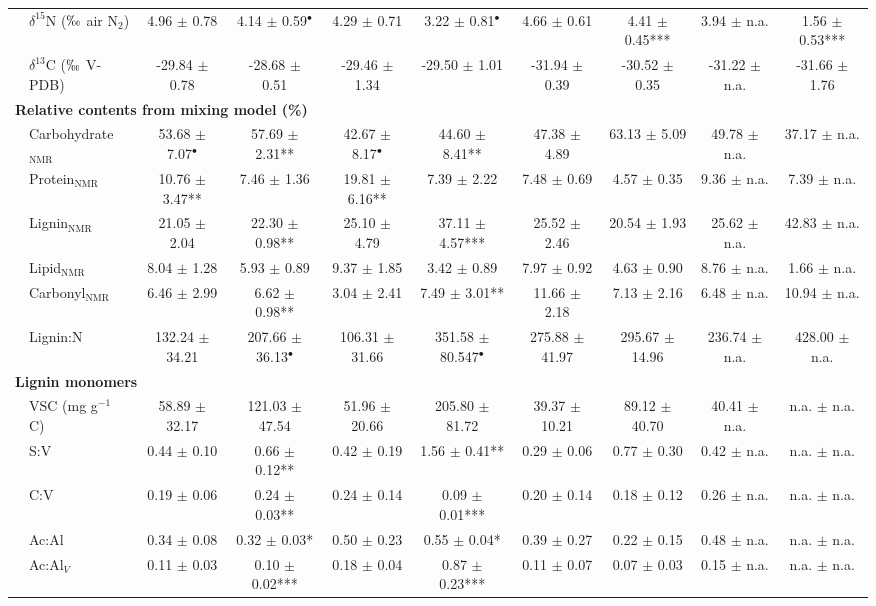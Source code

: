 \begin{table}
\begin{tabular}{llcccccccc}
  & $\delta^{15}$N ($\permil$ air N$_2$) & 4.96 $\pm$ 0.78 & 4.14 $\pm$ 0.59$^{\bullet}$ & 4.29 $\pm$ 0.71 & 3.22 $\pm$ 0.81$^{\bullet}$ & 4.66 $\pm$ 0.61 & 4.41 $\pm$ 0.45*** & 3.94 $\pm$ n.a. & 1.56 $\pm$ 0.53*** \\
  & $\delta^{13}$C ($\permil$ V-PDB) & -29.84 $\pm$ 0.78 & -28.68 $\pm$ 0.51 & -29.46 $\pm$ 1.34 & -29.50 $\pm$ 1.01 & -31.94 $\pm$ 0.39 & -30.52 $\pm$ 0.35 & -31.22 $\pm$ n.a. & -31.66 $\pm$ 1.76 \\
  \midrule
  \multicolumn{10}{l}{\textbf{Relative contents from mixing model (\%)}} \\
  & Carbohydrate$_{\text{NMR}}$ & 53.68 $\pm$ 7.07$^{\bullet}$ & 57.69 $\pm$ 2.31** & 42.67 $\pm$ 8.17$^{\bullet}$ & 44.60 $\pm$ 8.41** & 47.38 $\pm$ 4.89 & 63.13 $\pm$ 5.09 & 49.78 $\pm$ n.a. & 37.17 $\pm$ n.a. \\
  & Protein$_{\text{NMR}}$ & 10.76 $\pm$ 3.47** & 7.46 $\pm$ 1.36 & 19.81 $\pm$ 6.16** & 7.39 $\pm$ 2.22 & 7.48 $\pm$ 0.69 & 4.57 $\pm$ 0.35 & 9.36 $\pm$ n.a. & 7.39 $\pm$ n.a. \\
  & Lignin$_{\text{NMR}}$ & 21.05 $\pm$ 2.04 & 22.30 $\pm$ 0.98** & 25.10 $\pm$ 4.79 & 37.11 $\pm$ 4.57*** & 25.52 $\pm$ 2.46 & 20.54 $\pm$ 1.93 & 25.62 $\pm$ n.a. & 42.83 $\pm$ n.a. \\
  & Lipid$_{\text{NMR}}$ & 8.04 $\pm$ 1.28 & 5.93 $\pm$ 0.89 & 9.37 $\pm$ 1.85 & 3.42 $\pm$ 0.89 & 7.97 $\pm$ 0.92 & 4.63 $\pm$ 0.90 & 8.76 $\pm$ n.a. & 1.66 $\pm$ n.a. \\
  & Carbonyl$_{\text{NMR}}$ & 6.46 $\pm$ 2.99 & 6.62 $\pm$ 0.98** & 3.04 $\pm$ 2.41 & 7.49 $\pm$ 3.01** & 11.66 $\pm$ 2.18 & 7.13 $\pm$ 2.16 & 6.48 $\pm$ n.a. & 10.94 $\pm$ n.a. \\
  & Lignin:N & 132.24 $\pm$ 34.21 & 207.66 $\pm$ 36.13$^{\bullet}$ & 106.31 $\pm$ 31.66 & 351.58 $\pm$ 80.547$^{\bullet}$ & 275.88 $\pm$ 41.97 & 295.67 $\pm$ 14.96 & 236.74 $\pm$ n.a. & 428.00 $\pm$ n.a. \\
  \midrule
  \multicolumn{10}{l}{\textbf{Lignin monomers}} \\
  & VSC (mg g$^{-1}$ C) & 58.89 $\pm$ 32.17 & 121.03 $\pm$ 47.54 & 51.96 $\pm$ 20.66 & 205.80 $\pm$ 81.72 & 39.37 $\pm$ 10.21 & 89.12 $\pm$ 40.70 & 40.41 $\pm$ n.a. & n.a. $\pm$ n.a. \\
  & S:V & 0.44 $\pm$ 0.10 & 0.66 $\pm$ 0.12** & 0.42 $\pm$ 0.19 & 1.56 $\pm$ 0.41** & 0.29 $\pm$ 0.06 & 0.77 $\pm$ 0.30 & 0.42 $\pm$ n.a. & n.a. $\pm$ n.a. \\
  & C:V & 0.19 $\pm$ 0.06 & 0.24 $\pm$ 0.03** & 0.24 $\pm$ 0.14 & 0.09 $\pm$ 0.01*** & 0.20 $\pm$ 0.14 & 0.18 $\pm$ 0.12 & 0.26 $\pm$ n.a. & n.a. $\pm$ n.a. \\
  & Ac:Al & 0.34 $\pm$ 0.08 & 0.32 $\pm$ 0.03* & 0.50 $\pm$ 0.23 & 0.55 $\pm$ 0.04* & 0.39 $\pm$ 0.27 & 0.22 $\pm$ 0.15 & 0.48 $\pm$ n.a. & n.a. $\pm$ n.a. \\
  & Ac:Al$_V$ & 0.11 $\pm$ 0.03 & 0.10 $\pm$ 0.02*** & 0.18 $\pm$ 0.04 & 0.87 $\pm$ 0.23*** & 0.11 $\pm$ 0.07 & 0.07 $\pm$ 0.03 & 0.15 $\pm$ n.a. & n.a. $\pm$ n.a. \\
  \bottomrule
  \end{tabular}
  \label{tab:M5-T1}
  \end{table}

